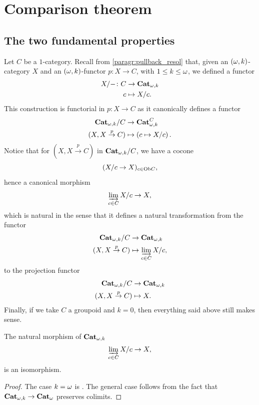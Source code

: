 \section{Comparison theorem}\label{sec:comparison}

\subsection{The two fundamental properties}
\begin{paragr}\label{paragr:colimtr}
  Let $C$ be a $1$\nbd-category. Recall from \ref{paragr:pullback_resol} that, given an $(\omega,k)$\nbd-category
  $X$ and an $(\omega,k)$\nbd-functor $p \colon X \to C$, with $1 \leq k \leq \omega$, we defined a functor
    \[
    \begin{aligned}
      X/- \colon C &\to \mathbf{Cat}_{\omega,k} \\
      c &\mapsto X/c.
    \end{aligned}
  \]
    This
    construction is functorial in $p\colon X \to C$ as it canonically defines a functor
  \begin{align*}
    \mathbf{Cat}_{\omega,k}/C &\to \mathbf{Cat}_{\omega,k}^{C}\\
    (X, X \overset{p}{\to} C) &\mapsto \left(c \mapsto X/c\right).
  \end{align*}
  Notice that for $(X, X \overset{p}{\to} C)$ in $\mathbf{Cat}_{\omega,k}/C$,
  we have a cocone
  \[
    (X/c \to X)_{c \in \mathrm{Ob}{C}},
  \]
  hence
  a canonical morphism
  \[
    \varinjlim_{c \in C}X/c \to X,
  \]
  which is natural in the sense that it defines a natural
  transformation from the functor
  \begin{align*}
    \mathbf{Cat}_{\omega,k}/C &\to \mathbf{Cat}_{\omega,k}\\
    (X, X \overset{p}{\to} C) &\mapsto \varinjlim_{c \in C} X/c,
  \end{align*}
  to the projection functor
    \begin{align*}
    \mathbf{Cat}_{\omega,k}/C &\to \mathbf{Cat}_{\omega,k}\\
    (X, X \overset{p}{\to} C) &\mapsto X.
    \end{align*}
    Finally, if we take $C$ a groupoid and $k=0$, then everything said
    above still makes sense.
\end{paragr}
\begin{lemma}\label{lemma:colim}
  The natural morphism of $\mathbf{Cat}_{\omega,k}$
  \[
     \varinjlim_{c \in C}X/c \to X,
   \]
   is an isomorphism.
\end{lemma}
\begin{proof}
The case $k=\omega$ is \cite[Lemma 7.5]{guetta:homcat}. The general case
follows from the fact that $\mathbf{Cat}_{\omega,k} \to \mathbf{Cat}_{\omega}$
  preserves colimits.
\end{proof}
